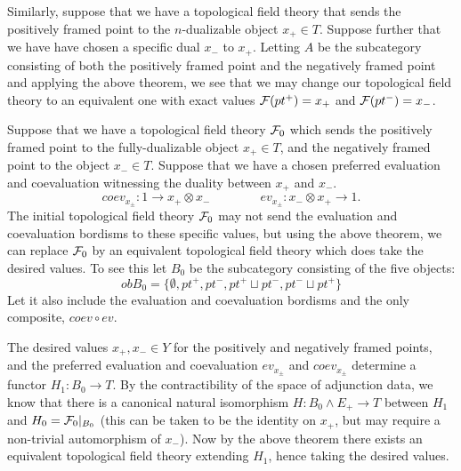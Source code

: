 \documentclass{amsart}
\begin{document}
\begin{example}	
	Similarly, suppose that we have a topological field theory that sends the positively framed point to the $n$-dualizable object $x_+ \in T$. Suppose further that we have have chosen a specific dual $x_-$ to $x_+$. Letting $A$ be the subcategory consisting of both the positively framed point and the negatively framed point and applying the above theorem, we see that we may change our topological field theory to an equivalent one with exact values $\mathcal F(pt^+) = x_+$ and $\mathcal F(pt^-) = x_-$.   
\end{example}	

\begin{example}
	Suppose that we have a topological field theory $\mathcal F_0$ which sends the positively framed point to the fully-dualizable object $x_+ \in T$, and the negatively framed point to the object $x_- \in T$. Suppose that we have a chosen preferred evaluation and coevaluation witnessing the duality between $x_+$ and $x_-$. 
\begin{equation*}
	coev_{x_\pm}: 1 \to x_+ \otimes x_- \qquad \qquad ev_{x_\pm}: x_- \otimes x_+ \to 1.
\end{equation*}	
	The initial topological field theory $\mathcal F_0$ may not send the evaluation and coevaluation bordisms to these specific values, but using the above theorem, we can replace $\mathcal F_0$ by an equivalent topological field theory which does take the desired values. To see this let $B_0$ be the subcategory consisting of the five objects:
	\begin{equation*}
		ob B_0 = \{ \emptyset, pt^+, pt^-, pt^+ \sqcup pt^-, pt^- \sqcup pt^+ \}
	\end{equation*}
	Let it also include the evaluation and coevaluation bordisms and the only composite, $coev \circ ev$. 
	
The desired values $x_+, x_- \in Y$ for the positively and negatively framed points, and the preferred evaluation and coevaluation $ev_{x_\pm}$ and $coev_{x_\pm}$ determine a functor $H_1: B_0 \to T$. By the contractibility of the space of adjunction data, we know that there is a canonical natural isomorphism $H: B_0 \wedge E_+ \to T$ between $H_1$ and $H_0 = \mathcal F_0|_{B_0}$ (this can be taken to be the identity on $x_+$, but may require a non-trivial automorphism of $x_-$). Now by the above theorem there exists an equivalent topological field theory extending $H_1$, hence taking the desired values. 
\end{example}
\end{document}
